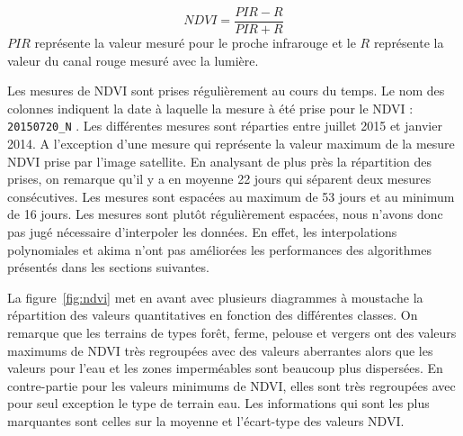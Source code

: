 \documentclass[twocolumn,10pt]{article}
\begin{document}
\begin{equation}
NDVI = \frac{PIR-R}{PIR+R}
\end{equation}
$PIR$ représente la valeur mesuré pour le proche infrarouge et le $R$ représente la valeur du canal rouge mesuré avec la lumière. 

Les mesures de NDVI sont prises régulièrement au cours du temps. Le nom des colonnes indiquent la date à laquelle la mesure à été prise pour le NDVI : \verb?20150720_N? . Les différentes mesures sont réparties entre juillet 2015 et janvier 2014. A l'exception d'une mesure qui représente la valeur maximum de la mesure NDVI prise par l'image satellite. En analysant de plus près la répartition des prises, on remarque qu'il y a en moyenne 22 jours qui séparent deux mesures consécutives. Les mesures sont espacées au maximum de 53 jours et au minimum de 16 jours. Les mesures sont plutôt régulièrement espacées, nous n'avons donc pas jugé nécessaire d'interpoler les données. En effet, les interpolations polynomiales et akima n'ont pas améliorées les performances des algorithmes présentés dans les sections suivantes. 

La figure~\ref{fig:ndvi} met en avant avec plusieurs diagrammes à moustache la répartition des valeurs quantitatives en fonction des différentes classes. On remarque que les terrains de types forêt, ferme, pelouse et vergers ont des valeurs maximums de NDVI très regroupées avec des valeurs aberrantes alors que les valeurs pour l'eau et les zones imperméables sont beaucoup plus dispersées. En contre-partie pour les valeurs minimums de NDVI, elles sont très regroupées avec pour seul exception le type de terrain eau. Les informations qui sont les plus marquantes sont celles sur la moyenne et l'écart-type des valeurs NDVI. 
\end{document}
